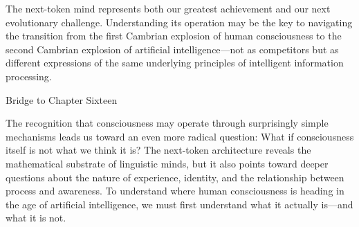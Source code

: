 The next-token mind represents both our greatest achievement and our next evolutionary challenge. Understanding its operation may be the key to navigating the transition from the first Cambrian explosion of human consciousness to the second Cambrian explosion of artificial intelligence—not as competitors but as different expressions of the same underlying principles of intelligent information processing.

Bridge to Chapter Sixteen

The recognition that consciousness may operate through surprisingly simple mechanisms leads us toward an even more radical question: What if consciousness itself is not what we think it is? The next-token architecture reveals the mathematical substrate of linguistic minds, but it also points toward deeper questions about the nature of experience, identity, and the relationship between process and awareness. To understand where human consciousness is heading in the age of artificial intelligence, we must first understand what it actually is—and what it is not.
